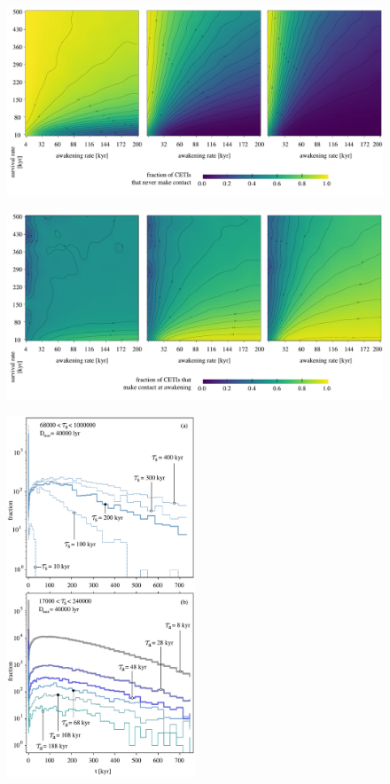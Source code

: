  


\begin{figure} %
   \centering
   \includegraphics[width=\textwidth]{matrix_1.pdf}
   \label{F_never_contact}
\end{figure}
 
\begin{figure} %
   \centering
   \includegraphics[width=\textwidth]{matrix_2.pdf}
   \label{F_C_at_A}
\end{figure}
 
\begin{figure}
   \centering
   \includegraphics[width=0.5\textwidth]{waiting_s+a_dif_ylog.pdf}
   \label{F_waiting_for_1C}
\end{figure}

